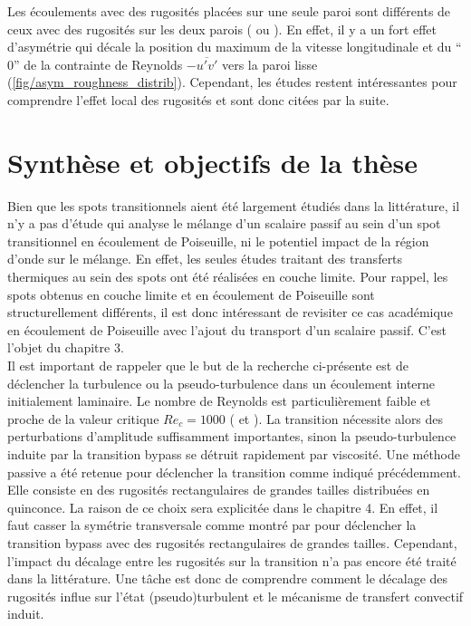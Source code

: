 Les écoulements avec des rugosités placées sur une seule paroi sont différents de ceux avec des rugosités sur les deux parois (\cite{Bakken2005} ou \cite{Krogstad2005}). En effet, il y a un fort effet d'asymétrie qui décale la position du maximum de la vitesse longitudinale et du \foreignquote{french}{$0$} de la contrainte de Reynolds $-\overline{u'v'}$ vers la paroi lisse (\cref{fig/asym_roughness_distrib}). Cependant, les études restent intéressantes pour comprendre l'effet local des rugosités et sont donc citées par la suite.

\clearpage
\section{Synthèse et objectifs de la thèse}

Bien que les spots transitionnels aient été largement étudiés dans la littérature, il n'y a pas d'étude qui analyse le mélange d'un scalaire passif au sein d'un spot transitionnel en écoulement de Poiseuille, ni le potentiel impact de la région d'onde sur le mélange. En effet, les seules études traitant des transferts thermiques au sein des spots ont été réalisées en couche limite. Pour rappel, les spots obtenus en couche limite et en écoulement de Poiseuille sont structurellement différents, il est donc intéressant de revisiter ce cas académique en écoulement de Poiseuille avec l'ajout du transport d'un scalaire passif. C'est l'objet du chapitre 3.\\

Il est important de rappeler que le but de la recherche ci-présente est de déclencher la turbulence ou la pseudo-turbulence dans un écoulement interne initialement laminaire. Le nombre de Reynolds est particulièrement faible et proche de la valeur critique $Re_{c}=1000$ (\cite{Orszag1980} et \cite{Nishioka1985}). La transition nécessite alors des perturbations d'amplitude suffisamment importantes, sinon la pseudo-turbulence induite par la transition bypass se détruit rapidement par viscosité. Une méthode passive a été retenue pour déclencher la transition comme indiqué précédemment. Elle consiste en des rugosités rectangulaires de grandes tailles distribuées en quinconce. La raison de ce choix sera explicitée dans le chapitre 4. En effet, il faut casser la symétrie transversale comme montré par \cite{Anika2020} pour déclencher la transition bypass avec des rugosités rectangulaires de grandes tailles. Cependant, l'impact du décalage entre les rugosités sur la transition n'a pas encore été traité dans la littérature. Une tâche est donc de comprendre comment le décalage des rugosités influe sur l'état (pseudo)turbulent et le mécanisme de transfert convectif induit.\\

